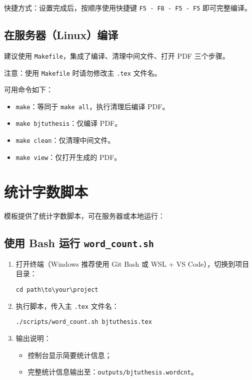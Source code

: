 \vspace{1em}
\noindent 快捷方式：设置完成后，按顺序使用快捷键 \verb|F5 - F8 - F5 - F5| 即可完整编译。

\subsection*{在服务器（Linux）编译}

建议使用 \verb|Makefile|，集成了编译、清理中间文件、打开 PDF 三个步骤。

注意：使用 \verb|Makefile| 时请勿修改主 \verb|.tex| 文件名。

可用命令如下：

\begin{itemize}
  \item \verb|make|：等同于 \verb|make all|，执行清理后编译 PDF。
  \item \verb|make bjtuthesis|：仅编译 PDF。
  \item \verb|make clean|：仅清理中间文件。
  \item \verb|make view|：仅打开生成的 PDF。
\end{itemize}


\section{统计字数脚本}

模板提供了统计字数脚本，可在服务器或本地运行：

\subsection*{使用 Bash 运行 \texttt{word\_count.sh}}

\begin{enumerate}
  \item 打开终端（Windows 推荐使用 Git Bash 或 WSL + VS Code），切换到项目目录：
  
  \begin{verbatim}
cd path\to\your\project
  \end{verbatim}

  \item 执行脚本，传入主 \verb|.tex| 文件名：
  
  \begin{verbatim}
./scripts/word_count.sh bjtuthesis.tex
  \end{verbatim}

  \item 输出说明：
  \begin{itemize}
    \item 控制台显示简要统计信息；
    \item 完整统计信息输出至：\verb|outputs/bjtuthesis.wordcnt|。
  \end{itemize}
\end{enumerate}

